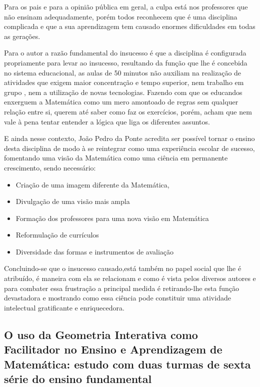 \documentclass[12pt,a4paper]{article}
\begin{document}
Para os pais e para a opinião pública em geral, a culpa está nos professores que não ensinam adequadamente, porém todos reconhecem que é uma disciplina complicada e que a sua aprendizagem tem causado enormes dificuldades em todas as gerações. 

Para o autor a razão fundamental do insucesso é que a disciplina é configurada propriamente para levar ao insucesso, resultando da função que lhe é concebida no sistema educacional, as aulas de 50 minutos não auxiliam na realização de atividades que exigem maior concentração e tempo superior, nem trabalho em grupo , nem a utilização de novas tecnologias. Fazendo com que os educandos enxerguem a Matemática como um mero amontoado de regras sem qualquer relação entre si, querem até saber como faz os exercícios, porém, acham que nem vale à pena tentar entender a lógica que liga os diferentes assuntos. 

E ainda nesse contexto, João Pedro da Ponte acredita ser possível tornar o ensino desta disciplina de modo à se reintegrar como uma experiência escolar de sucesso, fomentando uma visão da Matemática como uma ciência em permanente crescimento, sendo necessário: 

\begin{itemize}
	\item Criação de uma imagem diferente da Matemática,
	\item Divulgação de uma visão mais ampla 
	\item Formação dos professores para uma nova visão em Matemática 
	\item Reformulação de currículos 
	\item Diversidade das formas e instrumentos de avaliação 
\end{itemize}

Concluindo-se que o insucesso causado,está também no papel social que lhe é atribuído, é maneira com ela se relacionam e como é vista pelos diversos autores e para combater essa frustração a principal medida é retirando-lhe esta função devastadora e mostrando como essa ciência pode constituir uma atividade intelectual gratificante e enriquecedora. \citep{Pedro1994}

\subsection{O uso da Geometria Interativa como Facilitador no Ensino e Aprendizagem de Matemática: 
estudo com duas turmas de sexta série do ensino fundamental}
\end{document}
